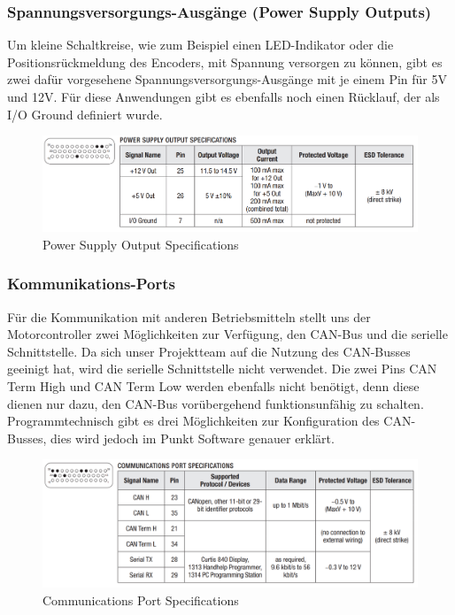 \subsubsection{Spannungsversorgungs-Ausgänge (Power Supply Outputs)}
Um kleine Schaltkreise, wie zum Beispiel einen LED-Indikator oder die Positionsrückmeldung des Encoders, mit Spannung versorgen zu können, gibt es zwei dafür vorgesehene Spannungsversorgungs-Ausgänge mit je einem Pin für 5V und 12V. Für diese Anwendungen gibt es ebenfalls noch einen Rücklauf, der als I/O Ground definiert wurde.

\begin{figure}[H]
	\begin{center}
		\includegraphics[width=\textwidth]{figures/antrieb/Power_Supply_Output_Specifications.png}
		\caption{Power Supply Output Specifications}
	\end{center}
\end{figure}


\newpage


\subsubsection{Kommunikations-Ports}
\label{Kommunikations-Port}
Für die Kommunikation mit anderen Betriebsmitteln stellt uns der Motorcontroller zwei Möglichkeiten zur Verfügung, den CAN-Bus und die serielle Schnittstelle. Da sich unser Projektteam auf die Nutzung des CAN-Busses geeinigt hat, wird die serielle Schnittstelle nicht verwendet. Die zwei Pins CAN Term High und CAN Term Low werden ebenfalls nicht benötigt, denn diese dienen nur dazu, den CAN-Bus vorübergehend funktionsunfähig zu schalten. Programmtechnisch gibt es drei Möglichkeiten zur Konfiguration des CAN-Busses, dies wird jedoch im Punkt Software genauer erklärt.

\begin{figure}[H]
	\begin{center}
		\includegraphics[width=\textwidth]{figures/antrieb/Communications_Port_Specifications.png}
		\caption{Communications Port Specifications}
	\end{center}
\end{figure}



